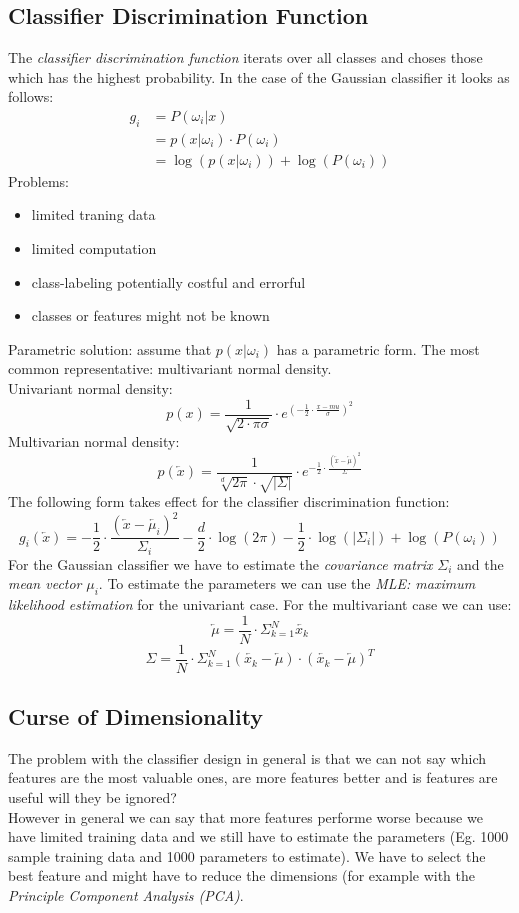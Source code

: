 \subsection{Classifier Discrimination Function}
\label{ssect:classfier-discrimination-function}
The \textit{classifier discrimination function} iterats over all classes and choses those which has the highest probability. In the case of the Gaussian classifier it looks as follows:
\begin{align*}
g_i &= P(\omega_i | x) \\
&= p(x | \omega_i) \cdot P(\omega_i) \\
&= \log(p(x | \omega_i)) + \log(P(\omega_i))
\end{align*}
Problems:
\begin{itemize}
	\item limited traning data
	\item limited computation
	\item class-labeling potentially costful and errorful
	\item classes or features might not be known
\end{itemize}
Parametric solution: assume that $p(x|\omega_i)$ has a parametric form. The most common representative: multivariant normal density.\\
Univariant normal density:
\[
p(x) = \frac{1}{\sqrt{2 \cdot \pi \sigma}} \cdot e^{(-\frac{1}{2} \cdot \frac{x - mu}{\sigma})^2}
\]
Multivarian normal density:
\[
p(\overleftarrow{x}) = \frac{1}{\sqrt[d]{2 \pi} \cdot \sqrt{|\Sigma|}} \cdot e^{-\frac{1}{2} \cdot \frac{(\overleftarrow{x} - \overleftarrow{\mu})^2}{\Sigma}}
\]
The following form takes effect for the classifier discrimination function:
\[
g_i(\overleftarrow{x}) = -\frac{1}{2} \cdot \frac{(\overleftarrow{x} - \overleftarrow{\mu_i})^2}{\Sigma_i} - \frac{d}{2} \cdot \log(2\pi) - \frac{1}{2} \cdot \log(|\Sigma_i|) + \log(P(\omega_i))
\]
For the Gaussian classifier we have to estimate the \textit{covariance matrix} $\Sigma_i$ and the \textit{mean vector} $\mu_i$. To estimate the parameters we can use the \textit{MLE: maximum likelihood estimation} for the univariant case.
For the multivariant case we can use:
\[
\overleftarrow{\mu} = \frac{1}{N} \cdot \Sigma_{k = 1}^{N} \overleftarrow{x_k}
\]
\[
\Sigma = \frac{1}{N} \cdot \Sigma_{k = 1}^{N} (\overleftarrow{x_k} - \overleftarrow{\mu}) \cdot (\overleftarrow{x_k} - \overleftarrow{\mu})^T
\]
\subsection{Curse of Dimensionality}
\label{ssect:curse-of-dimensionality}
The problem with the classifier design in general is that we can not say which features are the most valuable ones, are more features better and is features are useful will they be ignored? \\
However in general we can say that more features performe worse because we have limited training data and we still have to estimate the parameters (Eg. 1000 sample training data and 1000 parameters to estimate). We have to select the best feature and might have to reduce the dimensions (for example with the \textit{Principle Component Analysis (PCA)}.

